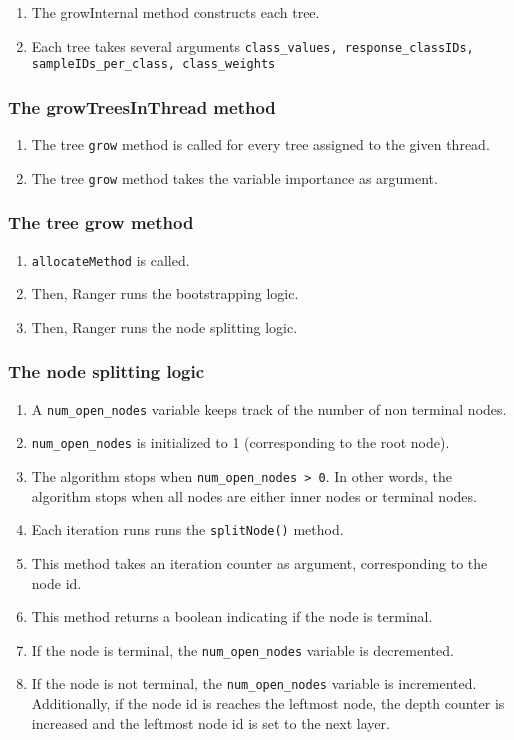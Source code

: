 \documentclass[12pt,oneside]{book}
\begin{document}
\begin{enumerate}
  \item The growInternal method constructs each tree.
  \item Each tree takes several arguments \lstinline|class_values, response_classIDs, sampleIDs_per_class, class_weights|
\end{enumerate}

\subsubsection{The growTreesInThread method}

\begin{enumerate}
  \item The tree \lstinline|grow| method is called for every tree assigned to the given thread.
  \item The tree \lstinline|grow| method takes the variable importance as argument.
\end{enumerate}

\subsubsection{The tree grow method}

\begin{enumerate}
  \item \lstinline|allocateMethod| is called.
  \item Then, Ranger runs the bootstrapping logic.
  \item Then, Ranger runs the node splitting logic.
\end{enumerate}

\subsubsection{The node splitting logic}

\begin{enumerate}
  \item A \lstinline|num_open_nodes| variable keeps track of the number of non terminal nodes.
  \item \lstinline|num_open_nodes| is initialized to 1 (corresponding to the root node).
  \item The algorithm stops when \lstinline|num_open_nodes > 0|. In other words, the algorithm stops when all nodes are either inner nodes or terminal nodes.
  \item Each iteration runs runs the \lstinline|splitNode()| method.
  \item This method takes an iteration counter as argument, corresponding to the node id.
  \item This method returns a boolean indicating if the node is terminal.
  \item If the node is terminal, the \lstinline|num_open_nodes| variable is decremented.
  \item If the node is not terminal, the \lstinline|num_open_nodes| variable is incremented. Additionally, if the node id is reaches the leftmost node, the depth counter is increased and the leftmost node id is set to the next layer.
\end{enumerate}
\end{document}
